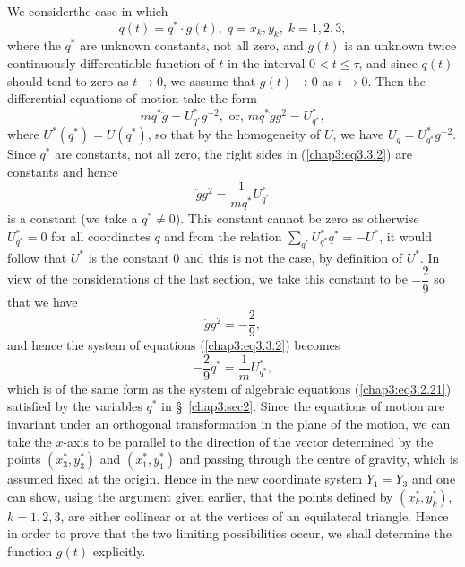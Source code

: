 We consider\pageoriginale  the case in which
\begin{equation*}
q(t) = q^*  \cdot g(t) , \; q = x_k , y_k, \; k = 1,2,3,
\tag{3.3.1}\label{chap3:eq3.3.1} 
\end{equation*}
where the $q^*$ are unknown constants, not all zero, and $g(t)$ is an
unknown twice continuously differentiable function of $t$ in the
interval $0 < t \leq \tau$, and since $q(t)$ should tend to zero as $t
\to 0$, we assume that $g(t) \to 0$ as $t \to 0$. Then the
differential equations of motion take the form  
\begin{equation*}
m q^* \ddot{g} = U^*_{q^*}  g^{-2}, \text{ or, } m q^* \ddot{g} g^2 =
U^*_{q^*}, \tag{3.3.2}\label{chap3:eq3.3.2} 
\end{equation*}
where $U^* (q^*) = U(q^*)$, so that by the homogeneity of $U$, we have
$U_q = U^*_{q^*} g^{-2}$. Since $q^*$ are constants, not all zero, the
right sides in (\ref{chap3:eq3.3.2}) are constants and hence 
$$
\ddot{g} g^2 = \frac{1}{mq^*} U^*_{q^*}
$$
is a constant (we take a $q^* \neq 0$). This constant cannot be zero
as otherwise $U^*_{q^*} = 0$ for all coordinates $q$ and from the
relation $\sum\limits_{q^*} U^*_{q^*} q^* = - U^*$, it would follow
that $U^*$ is the constant 0 and this is not the case, by definition
of $U^*$. In view of the considerations of the last section, we take
this constant to be $-\dfrac{2}{9}$ so that we have 
\begin{equation*}
\ddot{g} g^2 = - \frac{2}{9}, \tag{3.3.3}\label{chap3:eq3.3.3}
\end{equation*}
and hence the system of equations (\ref{chap3:eq3.3.2}) becomes
$$
-\frac{2}{9} q^* = \frac{1}{m} U^*_{q^*},
$$\pageoriginale
which is of the same form as the system of algebraic equations
(\ref{chap3:eq3.2.21}) satisfied by the variables $q^*$ in
\S\ \ref{chap3:sec2}. Since the equations of motion are invariant
under an orthogonal transformation in the plane of the motion, we can
take the $x$-axis to be parallel to the direction of the vector
determined by the points $(x^*_3, y^*_3)$ and $(x^*_1, y^*_1)$ and
passing through the centre of gravity, which is assumed fixed at the
origin.  Hence in the new coordinate system $Y_1 = Y_3$ and one can
show, using the argument given earlier, that the points defined by
$(x^*_k, y^*_k)$, $k =1,2,3$, are either collinear or at the vertices
of an equilateral triangle. Hence in order to prove that the two
limiting possibilities occur, we shall determine the function $g(t)$
explicitly. 

